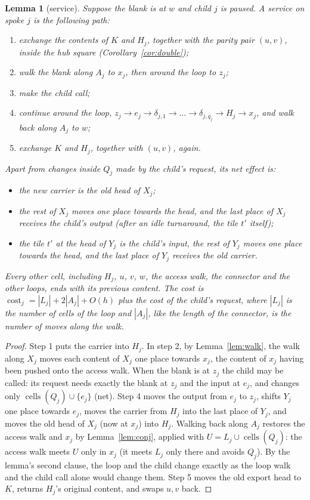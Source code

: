 \documentclass[11pt]{amsart}
\newtheorem{lemma}[theorem]{Lemma}
\theoremstyle{definition}
\newcommand{\cells}{\operatorname{cells}}
\newcommand{\cost}{\operatorname{cost}}
\begin{document}
\begin{lemma}[service]\label{lem:service}
Suppose the blank is at $w$ and child $j$ is paused. A service on spoke $j$ is the following path:
\begin{enumerate}[nosep]
\item exchange the contents of $K$ and $H_j$, together with the parity pair $(u,v)$, inside the hub square
  (Corollary~\ref{cor:double});
\item walk the blank along $A_j$ to $x_j$, then around the loop to $z_j$;
\item make the child call;
\item continue around the loop, $z_j\to e_j\to\delta_{j,1}\to\dots\to\delta_{j,q_j}\to H_j\to x_j$, and walk back along $A_j$ to $w$;
\item exchange $K$ and $H_j$, together with $(u,v)$, again.
\end{enumerate}
Apart from changes inside $Q_j$ made by the child's request, its net effect is:
\begin{itemize}[nosep]
\item the new carrier is the old head of $X_j$;
\item the rest of $X_j$ moves one place towards the head, and the last place of $X_j$ receives the child's output (after an idle
  turnaround, the tile $t'$ itself);
\item the tile $t'$ at the head of $Y_j$ is the child's input, the rest of $Y_j$ moves one place towards the head, and the last
  place of $Y_j$ receives the old carrier.
\end{itemize}
Every other cell, including $H_j$, $u$, $v$, $w$, the access walk, the connector and the other loops, ends with its previous content.
The cost is $\cost_j=|L_j|+2|A_j|+O(h)$ plus the cost of the child's request, where $|L_j|$ is the number of cells of the loop
and $|A_j|$, like the length of the connector, is the number of moves along the walk.
\end{lemma}

\begin{proof}
Step 1 puts the carrier into $H_j$. In step 2, by Lemma~\ref{lem:walk}, the walk along $X_j$ moves each
content of $X_j$ one place towards $x_j$, the content of $x_j$ having been pushed onto the access walk.
When the blank is at $z_j$ the child may be called: its request needs exactly the blank at $z_j$ and the
input at $e_j$, and changes only $\cells(Q_j)\cup\{e_j\}$ (net). Step 4 moves the output from $e_j$ to $z_j$, shifts
$Y_j$ one place towards $e_j$, moves the carrier from $H_j$ into the last place of $Y_j$, and moves
the old head of $X_j$ (now at $x_j$) into $H_j$. Walking back along $A_j$ restores the access walk and $x_j$ by Lemma~\ref{lem:conj}, applied with $U=L_j\cup\cells(Q_j)$:
the access walk meets $U$ only in $x_j$ (it meets $L_j$ only there and avoids $Q_j$). By the lemma's second clause, the
loop and the child change exactly as the loop walk and the child call alone would change them. Step 5 moves the old export head to $K$, returns $H_j$'s original content, and
swaps $u,v$ back.
\end{proof}
\end{document}
